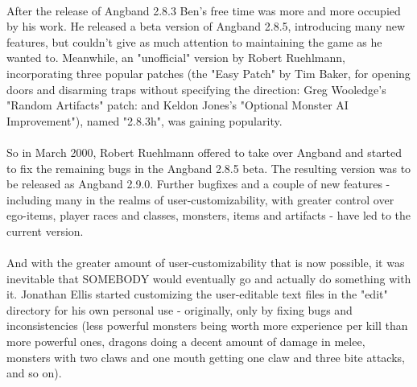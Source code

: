 \paragraph{}After the release of Angband 2.8.3 Ben's free time was more and more
occupied by his work.  He released a beta version of Angband 2.8.5,
introducing many new features, but couldn't give as much attention to
maintaining the game as he wanted to.  Meanwhile, an "unofficial" version
by Robert Ruehlmann, incorporating three popular patches (the "Easy Patch" 
by Tim Baker, for opening doors and disarming traps without specifying 
the direction: Greg Wooledge's "Random Artifacts" patch: and Keldon Jones's
"Optional Monster AI Improvement"), named "2.8.3h", was gaining popularity.

\paragraph{}So in March 2000, Robert Ruehlmann offered to take over Angband and
started to fix the remaining bugs in the Angband 2.8.5 beta.  The
resulting version was to be released as Angband 2.9.0. Further 
bugfixes and a couple of new features - including many in the realms
of user-customizability, with greater control over ego-items, player
races and classes, monsters, items and artifacts - have led to the 
current version.

\paragraph{}And with the greater amount of user-customizability that is now possible,
it was inevitable that SOMEBODY would eventually go and actually do 
something with it.  Jonathan Ellis started customizing the user-editable
text files in the "edit" directory for his own personal use - originally, 
only by fixing bugs and inconsistencies (less powerful monsters being worth
more experience per kill than more powerful ones, dragons doing a decent 
amount of damage in melee, monsters with two claws and one mouth getting 
one claw and three bite attacks, and so on).  

